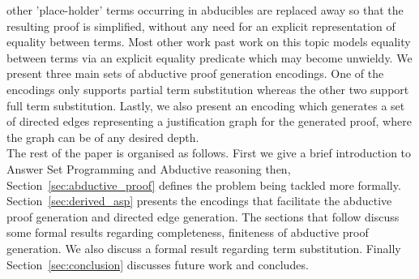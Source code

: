 other 'place-holder' terms occurring in abducibles are replaced away so that
the resulting proof is simplified, without any need for an explicit representation of equality between terms. Most other work past work on this topic models equality between terms via an explicit equality predicate which may become unwieldy. We present three main sets of abductive proof generation encodings. One of the encodings only supports partial term substitution whereas the other two support full term substitution. Lastly, we also present an encoding which generates a set of directed edges representing a justification 
graph  for the generated proof, where the graph can be of any desired depth.\\  The rest of the paper is organised as
follows. First we give a brief introduction to Answer Set Programming and Abductive reasoning then, Section~\ref{sec:abductive_proof} defines the problem being tackled more formally. Section~\ref{sec:derived_asp} presents the encodings that facilitate the abductive proof generation and directed edge generation. The sections that follow discuss some formal results regarding completeness, finiteness of abductive proof generation. We also discuss a formal result regarding term substitution. Finally Section~\ref{sec:conclusion} discusses
future work and concludes.
